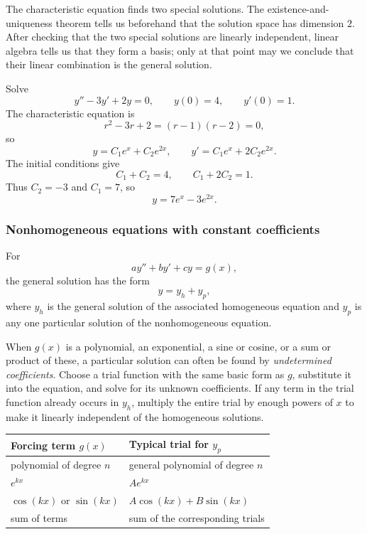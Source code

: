 \begin{remark}
    The characteristic equation finds two special solutions.  The
    existence-and-uniqueness theorem tells us beforehand that the solution
    space has dimension \(2\).  After checking that the two special
    solutions are linearly independent, linear algebra tells us that they
    form a basis; only at that point may we conclude that their linear
    combination is the general solution.
\end{remark}

\begin{eg}
    Solve
    \[
        y''-3y'+2y=0,
        \qquad y(0)=4,
        \qquad y'(0)=1.
    \]
    The characteristic equation is
    \[
        r^2-3r+2=(r-1)(r-2)=0,
    \]
    so
    \[
        y=C_1e^x+C_2e^{2x},
        \qquad
        y'=C_1e^x+2C_2e^{2x}.
    \]
    The initial conditions give
    \[
        C_1+C_2=4,
        \qquad
        C_1+2C_2=1.
    \]
    Thus \(C_2=-3\) and \(C_1=7\), so
    \[
        \boxed{y=7e^x-3e^{2x}}.
    \]
\end{eg}

\subsubsection{Nonhomogeneous equations with constant coefficients}

For
\[
    ay''+by'+cy=g(x),
\]
the general solution has the form
\[
    \boxed{y=y_h+y_p,}
\]
where \(y_h\) is the general solution of the associated homogeneous
equation and \(y_p\) is any one particular solution of the nonhomogeneous
equation.

When \(g(x)\) is a polynomial, an exponential, a sine or cosine, or a sum
or product of these, a particular solution can often be found by
\emph{undetermined coefficients}.  Choose a trial function with the same
basic form as \(g\), substitute it into the equation, and solve for its
unknown coefficients.  If any term in the trial function already occurs in
\(y_h\), multiply the entire trial by enough powers of \(x\) to make it
linearly independent of the homogeneous solutions.

\begin{center}
    \begin{tabular}{ll}
        \toprule
        Forcing term \(g(x)\) & Typical trial for \(y_p\) \\
        \midrule
        polynomial of degree \(n\)
            & general polynomial of degree \(n\) \\
        \(e^{kx}\) & \(Ae^{kx}\) \\
        \(\cos(kx)\) or \(\sin(kx)\)
            & \(A\cos(kx)+B\sin(kx)\) \\
        sum of terms & sum of the corresponding trials \\
        \bottomrule
    \end{tabular}
\end{center}

